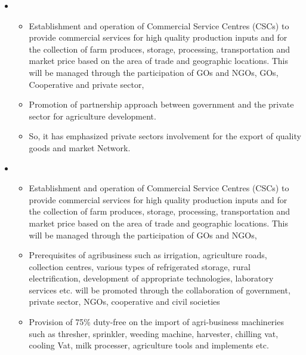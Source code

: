 \documentclass[12pt,ignorenonframetext,aspectratio=169]{beamer}
\providecommand{\tightlist}{%
  \setlength{\itemsep}{0pt}\setlength{\parskip}{0pt}}
\begin{document}
\begin{frame}{}
\protect\hypertarget{section-3}{}
\begin{itemize}
\item
  \begin{itemize}
  \tightlist
  \item
    Establishment and operation of Commercial Service Centres (CSCs) to
    provide commercial services for high quality production inputs and
    for the collection of farm produces, storage, processing,
    transportation and market price based on the area of trade and
    geographic locations. This will be managed through the participation
    of GOs and NGOs, GOs, Cooperative and private sector,
  \item
    Promotion of partnership approach between government and the private
    sector for agriculture development.
  \item
    So, it has emphasized private sectors involvement for the export of
    quality goods and market Network.
  \end{itemize}
\end{itemize}
\end{frame}

\begin{frame}{}
\protect\hypertarget{section-4}{}
\begin{itemize}
\item
  \begin{itemize}
  \tightlist
  \item
    Establishment and operation of Commercial Service Centres (CSCs) to
    provide commercial services for high quality production inputs and
    for the collection of farm produces, storage, processing,
    transportation and market price based on the area of trade and
    geographic locations. This will be managed through the participation
    of GOs and NGOs,
  \item
    Prerequisites of agribusiness such as irrigation, agriculture roads,
    collection centres, various types of refrigerated storage, rural
    electrification, development of appropriate technologies, laboratory
    services etc. will be promoted through the collaboration of
    government, private sector, NGOs, cooperative and civil societies
  \item
    Provision of 75\% duty-free on the import of agri-business
    machineries such as thresher, sprinkler, weeding machine, harvester,
    chilling vat, cooling Vat, milk processer, agriculture tools and
    implements etc.
  \end{itemize}
\end{itemize}
\end{frame}
\end{document}
